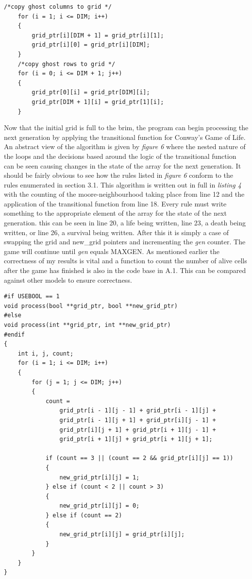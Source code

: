\documentclass[11pt]{article} %
\begin{document}
\begin{lstlisting}[caption = {Copying ghost cells}]
    /*copy ghost columns to grid */
    for (i = 1; i <= DIM; i++)
    {
        grid_ptr[i][DIM + 1] = grid_ptr[i][1];
        grid_ptr[i][0] = grid_ptr[i][DIM];
    }
    /*copy ghost rows to grid */
    for (i = 0; i <= DIM + 1; j++)
    {
        grid_ptr[0][i] = grid_ptr[DIM][i];
        grid_ptr[DIM + 1][i] = grid_ptr[1][i];
    }
\end{lstlisting}
Now that the initial grid is full to the brim, the program can begin processing the next generation by applying the transitional function for Conway's Game of Life. An abstract view of the algorithm is given by {\it figure 6} where the nested nature of the loops and the decisions based around the logic of the transitional function can be seen causing changes in the state of the array for the next generation. It should be fairly obvious to see how the rules listed in {\it figure 6} conform to the rules enumerated in section 3.1. This algorithm is written out in full in {\it listing 4} with the counting of the moore-neighbourhood taking place from line 12 and the application of the transitional function from line 18. Every rule must write something to the appropriate element of the array for the state of the next generation. this can be seen in line 20, a life being written, line 23, a death being written, or line 26, a survival being written. After this it is simply a case of swapping the grid and new\_grid pointers and incrementing the {\it gen} counter. The game will continue until {\it gen} equals MAXGEN. As mentioned earlier the correctness of my results is vital and a function to count the number of alive cells after the game has finished is also in the code base in A.1. This can be compared against other models to ensure correctness. 
\bigskip\bigskip\bigskip
\begin{lstlisting}[caption={Processing the Moore-neighbourhood and writing to the next generations global state array}]
#if USEBOOL == 1
void process(bool **grid_ptr, bool **new_grid_ptr)
#else
void process(int **grid_ptr, int **new_grid_ptr)
#endif
{
	int i, j, count;
	for (i = 1; i <= DIM; i++)
	{
		for (j = 1; j <= DIM; j++)
		{
			count =
			    grid_ptr[i - 1][j - 1] + grid_ptr[i - 1][j] +
			    grid_ptr[i - 1][j + 1] + grid_ptr[i][j - 1] +
			    grid_ptr[i][j + 1] + grid_ptr[i + 1][j - 1] +
			    grid_ptr[i + 1][j] + grid_ptr[i + 1][j + 1];

			if (count == 3 || (count == 2 && grid_ptr[i][j] == 1))
			{
				new_grid_ptr[i][j] = 1;
			} else if (count < 2 || count > 3)
			{
				new_grid_ptr[i][j] = 0;
			} else if (count == 2)
			{
				new_grid_ptr[i][j] = grid_ptr[i][j];
			}
		}
	}
}
\end{lstlisting}
\end{document}
